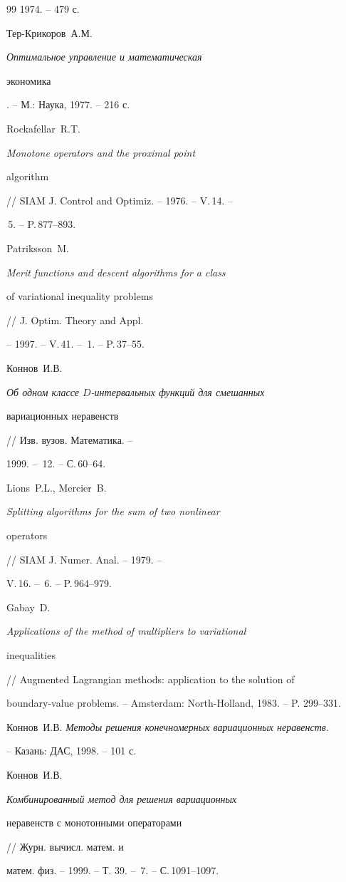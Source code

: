 \begin{thebibliography}{99}
1974. -- 479 с.




Тер-Крикоров~А.М. {\em Оптимальное управление и математическая


экономика}. -- М.: Наука, 1977. -- 216 с.




Rockafellar~R.T. {\em Monotone operators and the proximal point 


algorithm} // SIAM J. Control and Optimiz. -- 1976. -- V.\,14. --


\No\,5. -- P.\,877--893.




Patriksson~M. {\em Merit functions and descent algorithms for a class


of variational inequality problems} // J. Optim. Theory and Appl.


-- 1997. -- V.\,41. -- \No\,1. -- P.\,37--55.




Коннов~И.В. {\em Об одном классе $D$-интервальных функций для смешанных 


вариационных неравенств} // Изв. вузов. Математика. --


1999. -- \No\,12. -- С.\,60--64.




Lions~P.L., Mercier~B. {\em Splitting algorithms for the sum of two nonlinear


operators} // SIAM J. Numer. Anal. -- 1979. --


V.\,16. -- \No\,6. -- P.\,964--979.




Gabay~D. {\em Applications of the method of multipliers to variational


inequalities} // Augmented Lagrangian methods: application to the solution of 


boundary-value problems. -- Amsterdam: North-Holland, 1983. -- P. 299--331.




Коннов~И.В. {\em Методы решения конечномерных вариационных неравенств}.


-- Казань: ДАС, 1998. -- 101 с.




Коннов~И.В. {\em Комбинированный метод для решения вариационных 


неравенств с монотонными операторами} // Журн. вычисл. матем. и 


матем. физ. -- 1999. -- Т. 39. -- \No\,7. -- С.\,1091--1097.





\end{thebibliography}





\vskip 2cm












\label{end}








